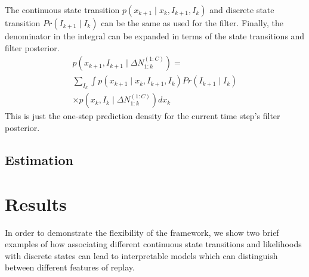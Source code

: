 \documentclass[conference]{IEEEtran}
\begin{document}
The continuous state transition $p(x_{k+1} \mid x_{k}, I_{k+1}, I_{k})$ and discrete state transition $Pr(I_{k+1} \mid I_{k})$ can be the same as used for the filter. Finally, the denominator in the integral can be expanded in terms of the state transitions and filter posterior.
\begin{multline}
p(x_{k+1}, I_{k+1} \mid \Delta N_{1:k}^{(1:C)}) = \\
\sum_{I_{k}} \int p(x_{k+1} \mid x_{k}, I_{k+1}, I_{k}) Pr(I_{k+1} \mid I_{k}) \\
\times p(x_{k}, I_{k} \mid \Delta N_{1:k}^{(1:C)}) dx_{k}
\end{multline}
This is just the one-step prediction density for the current time step's filter posterior.

\subsection{Estimation}
\section{Results}
In order to demonstrate the flexibility of the framework, we show two brief examples of how associating different continuous state transitions and likelihoods with discrete states can lead to interpretable models which can distinguish between different features of replay.
\end{document}
